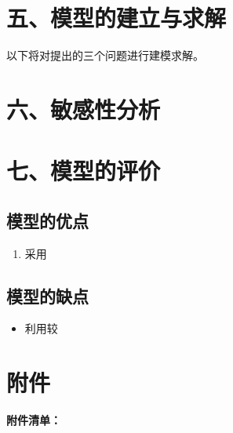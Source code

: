 \documentclass{my_paper}
\begin{document}
\section{五、模型的建立与求解}

以下将对提出的三个问题进行建模求解。
\section{六、敏感性分析}
\section{七、模型的评价}

\subsection{模型的优点}
\begin{enumerate}
    \item 采用

\end{enumerate}

\subsection{模型的缺点}
\begin{itemize}
    \item 利用较

\end{itemize}

\newpage
\begin{center}
\end{center}

\newpage
\section{附件}
\textbf{附件清单：}
\renewcommand\theenumi{\roman{enumi}}
\renewcommand\labelenumi{\textbf{附录\theenumi}}
\begin{itemize}
\end{itemize}



% 
\end{document}
